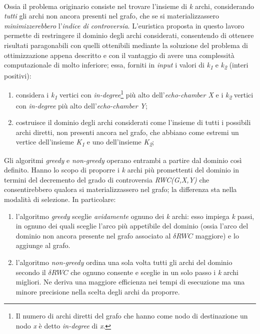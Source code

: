 \\
Ossia il problema originario consiste nel trovare l'insieme di \textit{k} archi, considerando \textit{tutti} gli archi non ancora presenti nel grafo, che se si materializzassero \textit{minimizzerebbero} l'\textit{indice di controversia}.
L'euristica proposta in questo lavoro permette di restringere il dominio degli archi considerati, consentendo di ottenere risultati paragonabili con quelli ottenibili mediante la soluzione del problema di ottimizzazione appena descritto e con il vantaggio di avere una complessità computazionale di molto inferiore; essa, forniti in \textit{input} i valori di \textit{k\textsubscript{1}} e \textit{k\textsubscript{2}} (interi positivi):
\begin{enumerate}
\item considera i \textit{k\textsubscript{1}} vertici con \textit{in-degree}\footnote{Il numero di archi diretti del grafo che hanno come nodo di destinazione un nodo \textit{x} è detto \textit{in-degree} di \textit{x}.} più alto dell'\textit{echo-chamber X} e i \textit{k\textsubscript{2}} vertici con \textit{in-degree} più alto dell'\textit{echo-chamber Y};
\item costruisce il dominio degli archi considerati come l'insieme di tutti i possibili archi diretti, non presenti ancora nel grafo, che abbiano come estremi un vertice dell'insieme \textit{K\textsubscript{1}} e uno dell'insieme \textit{K\textsubscript{2}};  
\end{enumerate}
Gli algoritmi \textit{greedy} e \textit{non-greedy} operano entrambi a partire dal dominio così definito. Hanno lo scopo di proporre i \textit{k} archi più promettenti del dominio in termini del decremento del grado di controversia \textit{RWC(G,X,Y)} che consentirebbero qualora si materializzassero nel grafo; la differenza sta nella modalità di selezione. In particolare:
\begin{enumerate}
\item l'algoritmo \textit{greedy} sceglie \textit{avidamente} ognuno dei \textit{k} archi: esso impiega \textit{k} passi, in ognuno dei quali sceglie l'arco più appetibile del dominio (ossia l'arco del dominio non ancora presente nel grafo associato al $\delta RWC$ maggiore) e lo aggiunge al grafo.
\item l'algoritmo \textit{non-greedy} ordina una sola volta tutti gli archi del dominio secondo il $\delta RWC$ che ognuno consente e sceglie in un solo passo i \textit{k} archi migliori. Ne deriva una maggiore efficienza nei tempi di esecuzione ma una minore precisione nella scelta degli archi da proporre.
\end{enumerate}
